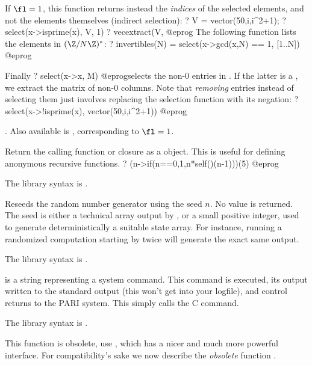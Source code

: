 {\noindent If $\fl = 1$, this function returns instead the \emph{indices} of
the selected elements, and not the elements themselves (indirect selection):
\bprog
? V = vector(50,i,i^2+1);
? select(x->isprime(x), V, 1)
? vecextract(V, %
@eprog\noindent
The following function lists the elements in $(\Z/N\Z)^*$:
\bprog
? invertibles(N) = select(x->gcd(x,N) == 1, [1..N])
@eprog

\noindent Finally
\bprog
? select(x->x, M)
@eprog\noindent selects the non-0 entries in . If the latter is a
, we extract the matrix of non-0 columns. Note that \emph{removing}
entries instead of selecting them just involves replacing the selection
function  with its negation:
\bprog
? select(x->!isprime(x), vector(50,i,i^2+1))
@eprog

. Also available
is ,
corresponding to $\fl = 1$.

\label{se:self}
Return the calling function or closure as a  object.
This is useful for defining anonymous recursive functions.
\bprog
? (n->if(n==0,1,n*self()(n-1)))(5)
@eprog

The library syntax is .

\label{se:setrand}
Reseeds the random number generator using the seed $n$. No value is
returned. The seed is either a technical array output by , or a
small positive integer, used to generate deterministically a suitable state
array. For instance, running a randomized computation starting by
 twice will generate the exact same output.

The library syntax is .

\label{se:system}
 is a string representing a system command. This command is
executed, its output written to the standard output (this won't get into your
logfile), and control returns to the PARI system. This simply calls the C
 command.

The library syntax is .

\label{se:trap}
This function is obsolete, use , which has a nicer and much
more powerful interface. For compatibility's sake we now describe the
\emph{obsolete} function .

}
